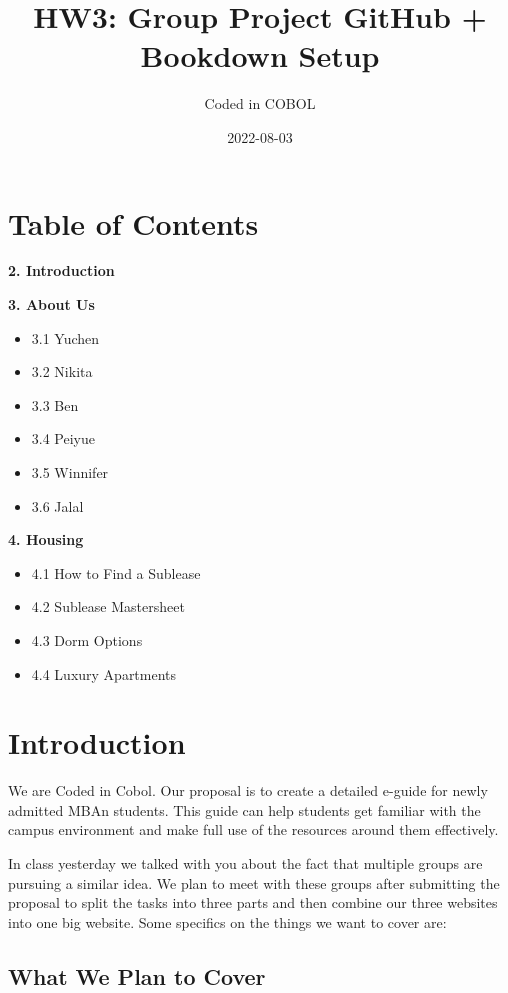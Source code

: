 \documentclass[
]{book}
\title{HW3: Group Project GitHub + Bookdown Setup}
\author{Coded in COBOL}
\date{2022-08-03}
\providecommand{\tightlist}{%
  \setlength{\itemsep}{0pt}\setlength{\parskip}{0pt}}
\begin{document}
\maketitle

{
\setcounter{tocdepth}{1}
\tableofcontents
}
\hypertarget{table-of-contents}{%
\chapter{Table of Contents}\label{table-of-contents}}

\textbf{2. Introduction}

\textbf{3. About Us}

\begin{itemize}
\tightlist
\item
  3.1 Yuchen
\item
  3.2 Nikita
\item
  3.3 Ben
\item
  3.4 Peiyue
\item
  3.5 Winnifer
\item
  3.6 Jalal
\end{itemize}

\textbf{4. Housing}

\begin{itemize}
\tightlist
\item
  4.1 How to Find a Sublease
\item
  4.2 Sublease Mastersheet
\item
  4.3 Dorm Options
\item
  4.4 Luxury Apartments
\end{itemize}

\hypertarget{introduction}{%
\chapter{Introduction}\label{introduction}}

We are Coded in Cobol. Our proposal is to create a detailed e-guide for newly admitted MBAn students. This guide can help students get familiar with the campus environment and make full use of the resources around them effectively.

In class yesterday we talked with you about the fact that multiple groups are pursuing a similar idea. We plan to meet with these groups after submitting the proposal to split the tasks into three parts and then combine our three websites into one big website. Some specifics on the things we want to cover are:

\hypertarget{what-we-plan-to-cover}{%
\section{What We Plan to Cover}\label{what-we-plan-to-cover}}
\end{document}
